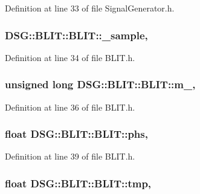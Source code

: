 Definition at line 33 of file Signal\-Generator.\-h.

\hypertarget{classDSG_1_1BLIT_1_1BLIT_ace572cf299ea45d5e6399d4a5a0dc31f}{
\subsubsection[{\-\_\-sample}]{ D\-S\-G\-::\-B\-L\-I\-T\-::\-B\-L\-I\-T\-::\-\_\-sample\hspace{0.3cm}{\ttfamily [protected]}, {\ttfamily [inherited]}}}\label{classDSG_1_1BLIT_1_1BLIT_ace572cf299ea45d5e6399d4a5a0dc31f}


Definition at line 34 of file B\-L\-I\-T.\-h.

\hypertarget{classDSG_1_1BLIT_1_1BLIT_ac21b921cd1a9b2ec1d091ae8ed0502a2}{
\subsubsection[{m\-\_\-}]{\setlength{\rightskip}{0pt plus 5cm}unsigned long D\-S\-G\-::\-B\-L\-I\-T\-::\-B\-L\-I\-T\-::m\-\_\-\hspace{0.3cm}{\ttfamily [protected]}, {\ttfamily [inherited]}}}\label{classDSG_1_1BLIT_1_1BLIT_ac21b921cd1a9b2ec1d091ae8ed0502a2}


Definition at line 36 of file B\-L\-I\-T.\-h.

\hypertarget{classDSG_1_1BLIT_1_1BLIT_aa3e9fc9fd7ed43eb583d43c36329afb6}{
\subsubsection[{phs}]{\setlength{\rightskip}{0pt plus 5cm}float D\-S\-G\-::\-B\-L\-I\-T\-::\-B\-L\-I\-T\-::phs\hspace{0.3cm}{\ttfamily [protected]}, {\ttfamily [inherited]}}}\label{classDSG_1_1BLIT_1_1BLIT_aa3e9fc9fd7ed43eb583d43c36329afb6}


Definition at line 39 of file B\-L\-I\-T.\-h.

\hypertarget{classDSG_1_1BLIT_1_1BLIT_a9e6750c5ef251bce48cdb55ed45697bb}{
\subsubsection[{tmp}]{\setlength{\rightskip}{0pt plus 5cm}float D\-S\-G\-::\-B\-L\-I\-T\-::\-B\-L\-I\-T\-::tmp\hspace{0.3cm}{\ttfamily [protected]}, {\ttfamily [inherited]}}}\label{classDSG_1_1BLIT_1_1BLIT_a9e6750c5ef251bce48cdb55ed45697bb}


